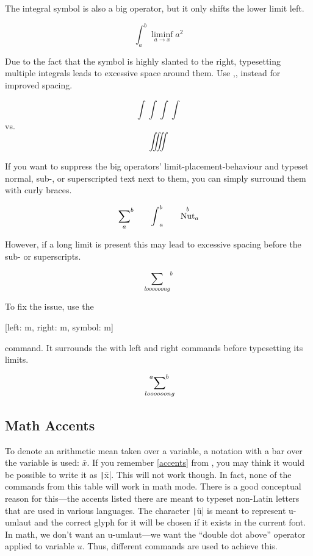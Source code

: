 The integral symbol is also a big operator, but it only shifts the lower limit
left.
\begin{example}
\[
  \int_a^b \liminf_{a \to x} a^2
\]
\end{example}
Due to the fact that the symbol is highly slanted to the right, typesetting
multiple integrals leads to excessive space around them. Use
,, instead for improved spacing.
\begin{example}
\[ \int\int\int\int \]
vs.\
\[ \iiiint \]
\end{example}

If you want to suppress the big operators' limit-placement-behaviour and typeset
normal, sub-, or superscripted text next to them, you can simply surround them
with curly braces.
\begin{example}
\[
  {\sum_{a}}^b
  \qquad%
  {\int}_a^b
  \qquad%
  {\nut^b}_a
\]
\end{example}
However, if a long limit is present this may lead to excessive spacing
before the sub- or superscripts.
\begin{example}
\[ {\sum_{loooooong}}^{b} \]
\end{example}
To fix the issue, use the
\begin{lscommand}
  [left: m, right: m, symbol: m]
\end{lscommand}
command. It surrounds the  with left and right commands before
typesetting its limits.
\begin{example}[vertical_mode, examplewidth=0.7\linewidth]
\[ \sideset{^{a}}{^{b}}{\sum}_{loooooong} \]
\end{example}

\subsection{Math Accents}\label{sec:math_accents}

To denote an arithmetic mean taken over a variable, a notation with a bar over
the variable is used: \(\bar x\). If you remember \autoref{accents} from
\autopageref{accents}, you may think it would be possible to write it as
\texttt|\=x|. This will not work though. In fact, none of the
commands from this table will work in math mode. There is a good conceptual
reason for this---the accents listed there are meant to typeset non-Latin
letters that are used in various languages. The character
\texttt|\"u| is meant to represent u-umlaut and the correct glyph
for it will be chosen if it exists in the current font. In math, we don't want
an u-umlaut---we want the \enquote{double dot above} operator applied to
variable \(u\). Thus, different commands are used to achieve this.

